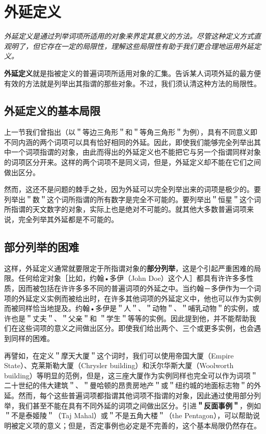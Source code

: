 \section{外延定义}

\begin{logicbox}[title=引言]
\textit{外延定义是通过列举词项所适用的对象来界定其意义的方法。尽管这种定义方式直观明了，但它存在一定的局限性，理解这些局限性有助于我们更合理地运用外延定义。}
\end{logicbox}

\textbf{外延定义}就是指被定义的普遍词项所适用对象的汇集。告诉某人词项外延的最方便有效的方法就是列举出其指谓的那些对象。不过，我们须认清这种方法的局限性。

\subsection{外延定义的基本局限}

上一节我们曾指出（以＂等边三角形＂和＂等角三角形＂为例），具有不同意义即不同内涵的两个词项可以具有恰好相同的外延。因此，即使我们能够完全列举出其中一个词项指谓的对象，由此而得出的外延定义也不能把它与另一个指谓同样对象的词项区分开来。这样的两个词项不是同义词，但是，外延定义却不能在它们之间做出区分。

然而，这还不是问题的棘手之处，因为外延可以完全列举出来的词项是极少的。要列举出＂数＂这个词所指谓的所有数字是完全不可能的。要列举出＂恒星＂这个词所指谓的天文数字的对象，实际上也是绝对不可能的。就其他大多数普遍词项来说，完全列举其外延都是不可能的。

\subsection{部分列举的困难}

这样，外延定义通常就要限定于所指谓对象的\textbf{部分列举}，这是个引起严重困难的局限。任何给定对象［比如，约翰•多伊（John Doe）这个人］都具有许许多多性质，因而被包括在许许多多不同的普遍词项的外延之中。当约翰－多伊作为一个词项的外延定义实例而被给出时，在许多其他词项的外延定义中，他也可以作为实例而被同样恰当地提及。约翰•多伊是＂人＂、＂动物＂、＂哺乳动物＂的实例，或许也是＂丈夫＂、＂父亲＂和 ＂学生＂等等的实例。因此提到他，并不能帮助我们在这些词项的意义之间做出区分。即使我们给出两个、三个或更多实例，也会遇到同样的困难。

再譬如，在定义＂摩天大厦＂这个词时，我们可以使用帝国大厦（Empire State）、克莱斯勒大厦（Chrysler building）和沃尔华斯大厦（Woolworth building）等明显的范例，但是，这三座大厦作为实例同样也完全可以作为词项＂二十世纪的伟大建筑＂、＂曼哈顿的昂贵房地产＂或＂纽约城的地面标志物＂的外延。然而，每个这些普遍词项都指谓其他词项不指谓的对象，因此通过使用部分列举，我们甚至不能在具有不同外延的词项之间做出区分。引进\textbf{＂反面事例＂}，例如＂不是泰姬陵＂（Taj Mahal）或＂不是五角大楼＂（the Pentagon），可以帮助说明被定义项的意义；但是，否定事例也必定是不完善的，这个基本局限仍然存在。

